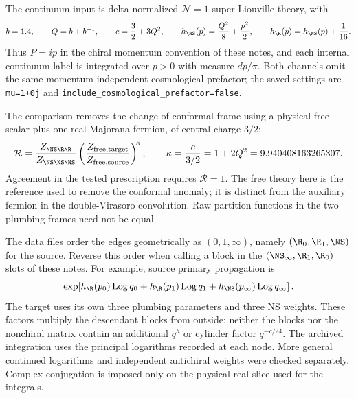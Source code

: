 The continuum input is delta-normalized $\mathcal N=1$ super-Liouville
theory, with
\begin{equation}
 b=1.4,\qquad Q=b+b^{-1},\qquad
 c=\frac32+3Q^2,\qquad
 h_{\NS}(p)=\frac{Q^2}{8}+\frac{p^2}{2},\qquad
 h_{\R}(p)=h_{\NS}(p)+\frac1{16}.
 \label{eq:partition-spectrum}
\end{equation}
Thus $P=ip$ in the chiral momentum convention of these notes, and
each internal continuum label is integrated over $p>0$ with measure
$dp/\pi$. Both channels omit the same momentum-independent
cosmological prefactor; the saved settings are
\texttt{mu=1+0j} and \texttt{include\_cosmological\_prefactor=false}.

The comparison removes the change of conformal frame using a physical
free scalar plus one real Majorana fermion, of central charge $3/2$:
\begin{equation}
 \mathcal R=
 \frac{Z_{\NS\R\R}}{Z_{\NS\NS\NS}}
 \left(\frac{Z_{\mathrm{free,target}}}
             {Z_{\mathrm{free,source}}}\right)^{\!\kappa},
 \qquad \kappa=\frac{c}{3/2}=1+2Q^2
              =9.940408163265307.
 \label{eq:partition-ratio}
\end{equation}
Agreement in the tested prescription requires $\mathcal R=1$.
The free theory here is the reference used to remove the conformal
anomaly; it is distinct from the auxiliary fermion in the
double-Virasoro convolution. Raw partition functions in the two
plumbing frames need not be equal.

The data files order the edges geometrically as $(0,1,\infty)$,
namely $(\R_0,\R_1,\NS)$ for the source. Reverse this order when
calling a block in the $(\NS_\infty,\R_1,\R_0)$ slots of these notes.
For example, source primary propagation is
\begin{equation}
 \exp\!\left[h_{\R}(p_0)\operatorname{Log} q_0+
 h_{\R}(p_1)\operatorname{Log} q_1+h_{\NS}(p_\infty)\operatorname{Log} q_\infty\right].
 \label{eq:partition-primary}
\end{equation}
The target uses its own three plumbing parameters and three NS
weights. These factors multiply the descendant blocks from outside;
neither the blocks nor the nonchiral matrix contain an additional
$q^h$ or cylinder factor $q^{-c/24}$. The archived integration uses
the principal logarithms recorded at each node. More general
continued logarithms and independent antichiral weights were checked
separately. Complex conjugation is imposed only on the physical real
slice used for the integrals.

